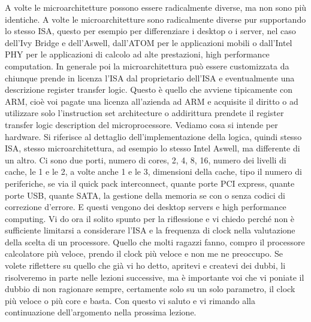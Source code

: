 A volte le microarchitetture possono essere radicalmente diverse, ma non sono più identiche.
A volte le microarchitetture sono radicalmente diverse pur supportando lo stesso ISA, questo per esempio per differenziare i desktop o i server, nel caso dell'Ivy Bridge e dell'Aswell, dall'ATOM per le applicazioni mobili o dall'Intel PHY per le applicazioni di calcolo ad alte prestazioni, high performance computation.
In generale poi la microarchitettura può essere customizzata da chiunque prende in licenza l'ISA dal proprietario dell'ISA e eventualmente una descrizione register transfer logic.
Questo è quello che avviene tipicamente con ARM, cioè voi pagate una licenza all'azienda ad ARM e acquisite il diritto o ad utilizzare solo l'instruction set architecture o addirittura prendete il register transfer logic description del microprocessore.
Vediamo cosa si intende per hardware.
Si riferisce al dettaglio dell'implementazione della logica, quindi stesso ISA, stesso microarchitettura, ad esempio lo stesso Intel Aswell, ma differente di un altro.
Ci sono due porti, numero di cores, 2, 4, 8, 16, numero dei livelli di cache, le 1 e le 2, a volte anche 1 e le 3, dimensioni della cache, tipo il numero di periferiche, se via il quick pack interconnect, quante porte PCI express, quante porte USB, quante SATA, la gestione della memoria se con o senza codici di correzione d'errore.
E questi vengono dei desktop servers e high performance computing.
Vi do ora il solito spunto per la riflessione e vi chiedo perché non è sufficiente limitarsi a considerare l'ISA e la frequenza di clock nella valutazione della scelta di un processore.
Quello che molti ragazzi fanno, compro il processore calcolatore più veloce, prendo il clock più veloce e non me ne preoccupo.
Se volete riflettere su quello che già vi ho detto, apritevi e createvi dei dubbi, li risolveremo in parte nelle lezioni successive, ma è importante voi che vi poniate il dubbio di non ragionare sempre, certamente solo su un solo parametro, il clock più veloce o più core e basta.
Con questo vi saluto e vi rimando alla continuazione dell'argomento nella prossima lezione.